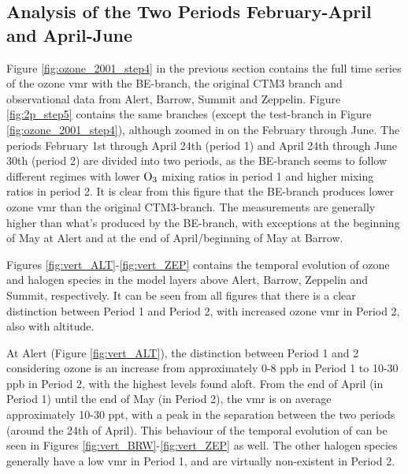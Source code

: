\subsection{Analysis of the Two Periods February-April and April-June}\label{sec:res_twoPeriods}

Figure \ref{fig:ozone_2001_step4} in the previous section contains the full time series of the ozone \acrshort{vmr} with the BE-branch, the original CTM3 branch and observational data from Alert, Barrow, Summit and Zeppelin. Figure \ref{fig:2p_step5} contains the same branches (except the test-branch in Figure \ref{fig:ozone_2001_step4}), although zoomed in on the February through June. The periods February 1st through April 24th (period 1) and April 24th through June 30th (period 2) are divided into two periods, as the BE-branch seems to follow different regimes with lower $\mathrm{O_3}$ mixing ratios in period 1 and higher mixing ratios in period 2. It is clear from this figure that the BE-branch produces lower ozone \acrshort{vmr} than the original CTM3-branch. The measurements are generally higher than what's produced by the BE-branch, with exceptions at the beginning of May at Alert and at the end of April/beginning of May at Barrow.

%


\medskip

Figures \ref{fig:vert_ALT}-\ref{fig:vert_ZEP} contains the temporal evolution of ozone and halogen species in the model layers above Alert, Barrow, Zeppelin and Summit, respectively. It can be seen from all figures that there is a clear distinction between Period 1 and Period 2, with increased ozone \acrshort{vmr} in Period 2, also with altitude. 

\medskip

At Alert (Figure \ref{fig:vert_ALT}), the distinction between Period 1 and 2 considering ozone is an increase from approximately 0-8 ppb in Period 1 to 10-30 ppb in Period 2, with the highest levels found aloft. From the end of April (in Period 1) until the end of May (in Period 2), the  \acrshort{vmr} is on average approximately 10-30 ppt, with a peak in the separation between the two periods (around the 24th of April). This behaviour of the temporal evolution of  can be seen in Figures \ref{fig:vert_BRW}-\ref{fig:vert_ZEP} as well. The other halogen species generally have a low \acrshort{vmr} in Period 1, and are virtually non-existent in Period 2. 

